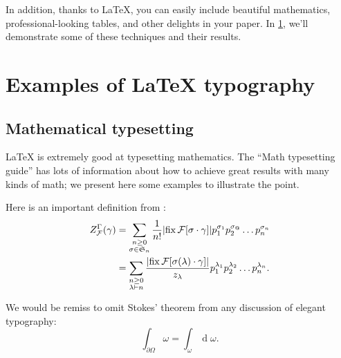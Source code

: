 \documentclass[twoside]{memoir}
\begin{document}
In addition, thanks to \LaTeX{}, you can easily include beautiful mathematics, professional-looking tables, and other delights in your paper.
In \cref{s:example}, we'll demonstrate some of these techniques and their results.

\chapter{Examples of \LaTeX{} typography}
\label{s:example}
\section{Mathematical typesetting}
\label{s:math}
\LaTeX{} is extremely good at typesetting mathematics.
The \enquote{Math typesetting guide} has lots of information about how to achieve great results with many kinds of math; we present here some examples to illustrate the point.

Here is an important definition from \cite[\S 4.1]{hend}:
\begin{subequations}
  \label{eq:gcidef}
  \begin{align}
    Z_{\mathcal{F}}^{\Gamma} (\gamma) &= \sum_{\substack{n \geq 0 \\ \sigma \in \mathfrak{S}_{n}}} \frac{1}{n!} \abs*{ \operatorname{fix} \mathcal{F} \sbrac{ \sigma \cdot \gamma } } p_{1}^{\sigma_{1}} p_{2}^{\sigma_{@}} \dots p_{n}^{\sigma_{n}} \label{eq:gcidefperm} \\
    &= \sum_{\substack{n \geq 0 \\ \lambda \vdash n}} \frac{\abs*{ \operatorname{fix} \mathcal{F} \sbrac{\sigma(\lambda) \cdot \gamma} }}{z_{\lambda}} p_{1}^{\lambda_{1}} p_{2}^{\lambda_{2}} \dots p_{n}^{\lambda_{n}}. \label{eq:gcidefpart}
  \end{align}
\end{subequations}

We would be remiss to omit Stokes' theorem from any discussion of elegant typography:
\begin{equation}
  \label{eq:stokes}
  \int_{\partial \Omega} \omega = \int_{\omega} \operatorname{d} \omega.
\end{equation}
\end{document}
